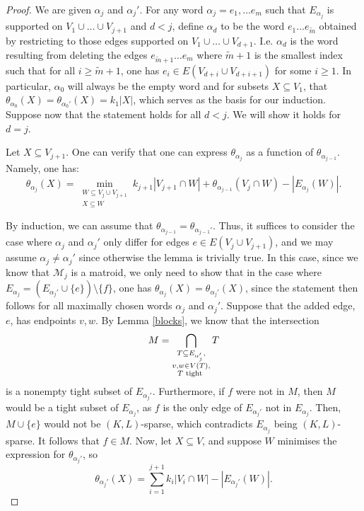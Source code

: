 \documentclass[10pt,a4paper]{article}
\begin{document}
\begin{proof}
We are given $\alpha_j$ and $\alpha_j'$. For any word $\alpha_j = e_1, \dots e_m$ such that $E_{\alpha_j}$ is supported on $V_1\cup \dots \cup V_{j+1}$ and $d<j$, define $\alpha_{d}$ to be the word $e_1 \dots e_{\tilde{m}}$ obtained by restricting to those edges supported on $V_1\cup \dots \cup V_{d+1}$. I.e. $\alpha_{d}$ is the word resulting from deleting the edges $e_{\tilde{m}+1}\dots e_{m}$ where $\tilde{m}+1$ is the smallest index such that for all $i\geq \tilde{m}+1$, one has $e_{i} \in E(V_{d+i}\cup V_{d+i+1})$ for some $i \geq 1$. In particular, $\alpha_{0}$ will always be the empty word and for subsets $X\subseteq V_1$, that $\theta_{\alpha_0}(X) = \theta_{\alpha_0'}(X) = k_1|X|$, which serves as the basis for our induction. Suppose now that the statement holds for all $d < j$. We will show it holds for $d=j$.

Let $X\subseteq V_{j+1}$. One can verify that one can express $\theta_{\alpha_{j}}$ as a function of $\theta_{\alpha_{j-1}}$. Namely, one has:
\begin{equation*}
    \theta_{\alpha_j}(X)= \min_{\substack{W\subseteq V_{j} \cup V_{j+1}\\[2pt] X\subseteq W}}  k_{j+1}|V_{j+1} \cap W| +\theta_{\alpha_{j-1}}(V_{j}\cap W)  -|E_{\alpha_j}(W)|.
\end{equation*}


By induction, we can assume that $\theta_{\alpha_{j-1}} = \theta_{\alpha_{j-1}'}$. Thus, it suffices to consider the case where $\alpha_{j}$ and $\alpha_{j}'$ only differ for edges $e\in E(V_{j}\cup V_{j+1})$, and we may assume $\alpha_{j}\neq \alpha_{j}'$ since otherwise the lemma is trivially true. In this case, since we know that $\mathcal{M}_{j}$ is a matroid, we only need to show that in the case where $E_{\alpha_{j}} = \left (E_{\alpha_{j}'} \cup \{e\}\right) \setminus \{f\}$, one has $\theta_{\alpha_{j}}(X) = \theta_{\alpha_{j}'}(X)$, since the statement then follows for all maximally chosen words $\alpha_j$ and $\alpha_j'$. Suppose that the added edge, $e$, has endpoints $v,w$. By Lemma \ref{blocks}, we know that the intersection 
\begin{equation*}
M  = \bigcap_{\substack{T\subseteq E_{\alpha_j'},\\ v,w \in V(T),\\ T \textup{ tight }}} T
\end{equation*}
is a nonempty tight subset of $E_{\alpha_j'}$.  Furthermore, if $f$ were not in $M$, then $M$ would be a tight subset of $E_{\alpha_j}$, as $f$ is the only edge of $E_{\alpha_j'}$ not in $E_{\alpha_j}$. Then, $M \cup \{e\}$ would not be $(K,L)$-sparse, which contradicts $E_{\alpha_j}$ being $(K,L)$-sparse. It follows that $f \in M$.  Now, let $X\subseteq V$, and suppose $W$ minimises the expression for $\theta_{\alpha_j'}$, so
\begin{equation*}
\theta_{\alpha_{j}'}(X) = \sum_{i=1}^{j+1} k_i|V_i\cap W| -|E_{\alpha_j'}(W)|.
\end{equation*}


\end{proof}
\end{document}
